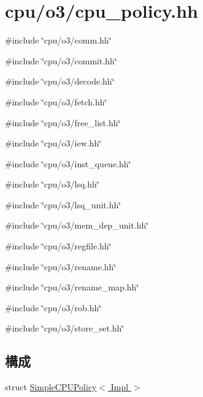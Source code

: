 \hypertarget{cpu__policy_8hh}{
\section{cpu/o3/cpu\_\-policy.hh}
\label{cpu__policy_8hh}
}
{\ttfamily \#include \char`\"{}cpu/o3/comm.hh\char`\"{}}\par
{\ttfamily \#include \char`\"{}cpu/o3/commit.hh\char`\"{}}\par
{\ttfamily \#include \char`\"{}cpu/o3/decode.hh\char`\"{}}\par
{\ttfamily \#include \char`\"{}cpu/o3/fetch.hh\char`\"{}}\par
{\ttfamily \#include \char`\"{}cpu/o3/free\_\-list.hh\char`\"{}}\par
{\ttfamily \#include \char`\"{}cpu/o3/iew.hh\char`\"{}}\par
{\ttfamily \#include \char`\"{}cpu/o3/inst\_\-queue.hh\char`\"{}}\par
{\ttfamily \#include \char`\"{}cpu/o3/lsq.hh\char`\"{}}\par
{\ttfamily \#include \char`\"{}cpu/o3/lsq\_\-unit.hh\char`\"{}}\par
{\ttfamily \#include \char`\"{}cpu/o3/mem\_\-dep\_\-unit.hh\char`\"{}}\par
{\ttfamily \#include \char`\"{}cpu/o3/regfile.hh\char`\"{}}\par
{\ttfamily \#include \char`\"{}cpu/o3/rename.hh\char`\"{}}\par
{\ttfamily \#include \char`\"{}cpu/o3/rename\_\-map.hh\char`\"{}}\par
{\ttfamily \#include \char`\"{}cpu/o3/rob.hh\char`\"{}}\par
{\ttfamily \#include \char`\"{}cpu/o3/store\_\-set.hh\char`\"{}}\par
\subsection*{構成}
\begin{DoxyCompactItemize}
\item 
struct \hyperlink{structSimpleCPUPolicy}{SimpleCPUPolicy$<$ Impl $>$}
\end{DoxyCompactItemize}
